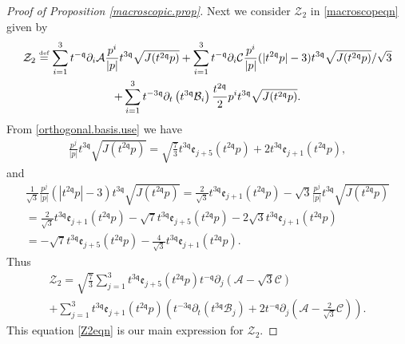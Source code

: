 \documentclass[reqno]{amsart}
\newcommand{\eqdef }{\overset{\mbox{\tiny{def}}}{=}}
\newcommand{\pv}{p}
\newcommand{\qq}{\mathfrak{q}}
\newcommand{\tmq}{t^{-\qq}}
\newcommand{\tqq}{t^{2\qq}}
\newcommand{\tTq}{t^{3\qq}}
\newcommand{\tmTq}{t^{-3\qq}}
\theoremstyle{definition}
\numberwithin{equation}{section}
\numberwithin{theorem}{section}
\begin{document}
\begin{proof}[Proof of Proposition \ref{macroscopic.prop}]
Next we consider $\mathcal{Z}_2$ in \eqref{macroscopeqn} given by 
\begin{multline}\notag
\mathcal{Z}_2 \eqdef 
\sum_{i=1}^3\tmq\partial_i\mathcal{A}\frac{p^i}{{| \pv|}}\tTq\sqrt{J(\tqq\pv)}
+
\sum_{i=1}^3\tmq\partial_i\mathcal{C}\frac{p^i}{{| \pv|}} ({|\tqq \pv|}-3)\tTq\sqrt{J(\tqq\pv)} /\sqrt{3}
\\
+\sum_{i=1}^{3} \tmTq\partial_t \left(\tTq \mathcal{B}_i \right) \frac{\tqq}{2} p^i \tTq\sqrt{J(\tqq\pv)}.
\end{multline}
From \eqref{orthogonal.basis.use} we have 
\begin{align*}
    \frac{p^j}{{| \pv|}}\tTq\sqrt{J(\tqq\pv)} = \sqrt{\frac{7}{3}}\tTq \mathfrak{e}_{j+5}(\tqq \pv)
    +
2\tTq \mathfrak{e}_{j+1}(\tqq \pv),
\end{align*}
and
\begin{multline*}
       \frac{1}{\sqrt{3}} \frac{p^j}{{| \pv|}}({|\tqq \pv|}-3)\tTq\sqrt{J(\tqq\pv)} = 
    \frac{2}{\sqrt{3}}\tTq \mathfrak{e}_{j+1}(\tqq \pv)
    -
    \sqrt{3} \frac{p^j}{{| \pv|}}\tTq\sqrt{J(\tqq\pv)}
    \\
    =
    \frac{2}{\sqrt{3}}\tTq \mathfrak{e}_{j+1}(\tqq \pv)
   -
    \sqrt{7}\tTq \mathfrak{e}_{j+5}(\tqq \pv)
    -
2\sqrt{3}\tTq \mathfrak{e}_{j+1}(\tqq \pv)
    \\
    =
   -
    \sqrt{7}\tTq \mathfrak{e}_{j+5}(\tqq \pv)
    -
\frac{4}{\sqrt{3}}\tTq \mathfrak{e}_{j+1}(\tqq \pv).
\end{multline*}
Thus
\begin{multline}\label{Z2eqn}
\mathcal{Z}_2 
=
\sqrt{\frac{7}{3}}
\sum_{j=1}^3\tTq \mathfrak{e}_{j+5}(\tqq \pv)\tmq\partial_j\left(\mathcal{A}
-\sqrt{3}\mathcal{C}\right)
\\
+
\sum_{j=1}^3\tTq \mathfrak{e}_{j+1}(\tqq \pv)\left(\tmTq\partial_t \left(\tTq \mathcal{B}_{j} \right)+2\tmq\partial_j\left(\mathcal{A}
-\frac{2}{\sqrt{3}}\mathcal{C}\right) \right).
\end{multline}
This equation \eqref{Z2eqn} is our main expression for $\mathcal{Z}_2 $.



\end{proof}
\end{document}

